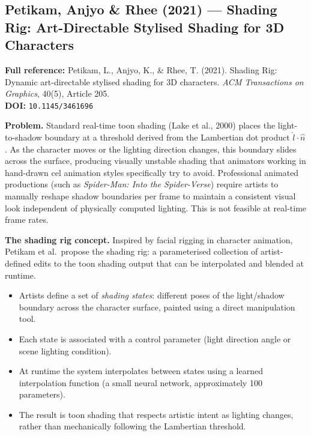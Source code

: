 \documentclass[11pt, a4paper]{article}
\begin{document}
\vspace{8pt}
\subsection{Petikam, Anjyo \& Rhee (2021) --- Shading Rig: Art-Directable Stylised Shading for 3D Characters}

\begin{refbox}
\textbf{Full reference:} Petikam, L., Anjyo, K., \& Rhee, T. (2021). Shading Rig: Dynamic art-directable stylised shading for 3D characters. \textit{ACM Transactions on Graphics}, 40(5), Article 205.\\[4pt]
\textbf{DOI:} \texttt{10.1145/3461696}
\end{refbox}

\textbf{Problem.} Standard real-time toon shading (Lake et al., 2000) places the light-to-shadow boundary at a threshold derived from the Lambertian dot product $\hat{l} \cdot \hat{n}$. As the character moves or the lighting direction changes, this boundary slides across the surface, producing visually unstable shading that animators working in hand-drawn cel animation styles specifically try to avoid. Professional animated productions (such as \textit{Spider-Man: Into the Spider-Verse}) require artists to manually reshape shadow boundaries per frame to maintain a consistent visual look independent of physically computed lighting. This is not feasible at real-time frame rates.

\textbf{The shading rig concept.} Inspired by facial rigging in character animation, Petikam et al.\ propose the shading rig: a parameterised collection of artist-defined edits to the toon shading output that can be interpolated and blended at runtime.

\begin{itemize}[leftmargin=2em]
  \item Artists define a set of \textit{shading states}: different poses of the light/shadow boundary across the character surface, painted using a direct manipulation tool.
  \item Each state is associated with a control parameter (light direction angle or scene lighting condition).
  \item At runtime the system interpolates between states using a learned interpolation function (a small neural network, approximately 100 parameters).
  \item The result is toon shading that respects artistic intent as lighting changes, rather than mechanically following the Lambertian threshold.
\end{itemize}
\end{document}
